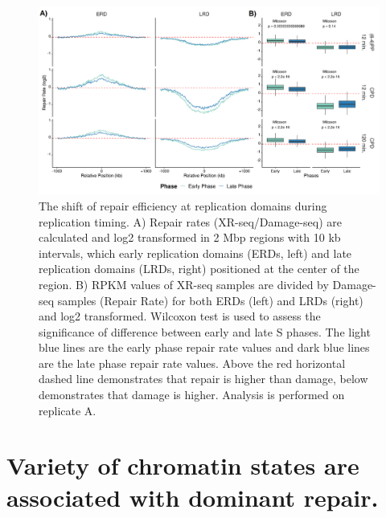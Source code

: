 \begin{figure}[H]
    \begin{center}
    \includegraphics[width=\textwidth]{Chapters/4_results/figures/fig2}
    \caption[The shift of repair efficiency at replication domains during replication timing.]{The shift of repair efficiency at replication domains during replication timing. A) Repair rates (XR-seq/Damage-seq) are calculated and log2 transformed in 2 Mbp regions with 10 kb intervals, which early replication domains (ERDs, left) and late replication domains (LRDs, right) positioned at the center of the region. B) RPKM values of XR-seq samples are divided by Damage-seq samples (Repair Rate) for both ERDs (left) and LRDs (right) and log2 transformed. Wilcoxon test is used to assess the significance of difference between early and late S phases. The light blue lines are the early phase repair rate values and dark blue lines are the late phase repair rate values. Above the red horizontal dashed line demonstrates that repair is higher than damage, below demonstrates that damage is higher. Analysis is performed on replicate A.}
    \label{fig:repdomain}
    \end{center}
    \end{figure}


\section{Variety of chromatin states are associated with dominant repair.}

